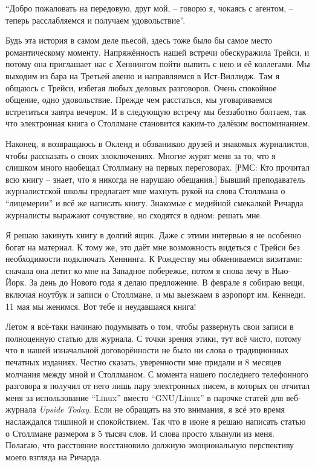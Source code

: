 \enquote{Добро пожаловать на передовую, друг мой, -- говорю я, чокаясь с агентом, -- теперь расслабляемся и получаем удовольствие}.

Будь эта история в самом деле пьесой, здесь тоже было бы самое место романтическому моменту. Напряжённость нашей встречи обескуражила Трейси, и потому она приглашает нас с Хеннингом пойти выпить с нею и её коллегами. Мы выходим из бара на Третьей авеню и направляемся в Ист-Виллидж. Там я общаюсь с Трейси, избегая любых деловых разговоров. Очень спокойное общение, одно удовольствие. Прежде чем расстаться, мы уговариваемся встретиться завтра вечером. И в следующую встречу мы беззаботно болтаем, так что электронная книга о Столлмане становится каким-то далёким воспоминанием.

Наконец, я возвращаюсь в Окленд и обзваниваю друзей и знакомых журналистов, чтобы рассказать о своих злоключениях. Многие журят меня за то, что я слишком много наобещал Столлману на первых переговорах. [РМС: Кто прочитал всю книгу -- знает, что я никогда не нарушаю обещания.] Бывший преподаватель журналистской школы предлагает мне махнуть рукой на слова Столлмана о \enquote{лицемерии} и всё же написать книгу. Знакомые с медийной смекалкой Ричарда журналисты выражают сочувствие, но сходятся в одном: решать мне.

Я решаю закинуть книгу в долгий ящик. Даже с этими интервью я не особенно богат на материал. К тому же, это даёт мне возможность видеться с Трейси без необходимости подключать Хеннинга. К Рождеству мы обмениваемся визитами: сначала она летит ко мне на Западное побережье, потом я снова лечу в Нью-Йорк. За день до Нового года я делаю предложение. В феврале я собираю вещи, включая ноутбук и записи о Столлмане, и мы выезжаем в аэропорт им. Кеннеди. 11 мая мы женимся. Вот тебе и неудавшаяся книга!

Летом я всё-таки начинаю подумывать о том, чтобы развернуть свои записи в полноценную статью для журнала. С точки зрения этики, тут всё чисто, потому что в нашей изначальной договорённости не было ни слова о традиционных печатных изданиях. Честно сказать, уверенности мне придали и 8 месяцев молчания между мной и Столлманом. С момента нашего последнего телефонного разговора я получил от него лишь пару электронных писем, в которых он отчитал меня за использование \enquote{Linux} вместо \enquote{GNU/Linux} в парочке статей для веб-журнала \textit{Upside Today}. Если не обращать на это внимания, я всё это время наслаждался тишиной и спокойствием. Так что в июне я решаю написать статью о Столлмане размером в 5 тысяч слов. И слова просто хлынули из меня. Полагаю, что расстояние восстановило должную эмоциональную перспективу моего взгляда на Ричарда.

